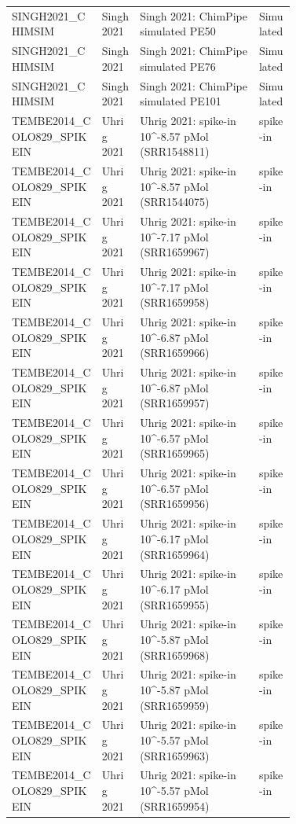 {\begin{longtable}{llp{0.42\linewidth}l}
SINGH2021\_CHIMSIM & Singh 2021 & Singh 2021: ChimPipe simulated PE50 & Simulated \\
SINGH2021\_CHIMSIM & Singh 2021 & Singh 2021: ChimPipe simulated PE76 & Simulated \\
SINGH2021\_CHIMSIM & Singh 2021 & Singh 2021: ChimPipe simulated PE101 & Simulated \\
TEMBE2014\_COLO829\_SPIKEIN & Uhrig 2021 & Uhrig 2021: spike-in 10\textasciicircum{}-8.57 pMol (SRR1548811) & spike-in \\
TEMBE2014\_COLO829\_SPIKEIN & Uhrig 2021 & Uhrig 2021: spike-in 10\textasciicircum{}-8.57 pMol (SRR1544075) & spike-in \\
TEMBE2014\_COLO829\_SPIKEIN & Uhrig 2021 & Uhrig 2021: spike-in 10\textasciicircum{}-7.17 pMol (SRR1659967) & spike-in \\
TEMBE2014\_COLO829\_SPIKEIN & Uhrig 2021 & Uhrig 2021: spike-in 10\textasciicircum{}-7.17 pMol (SRR1659958) & spike-in \\
TEMBE2014\_COLO829\_SPIKEIN & Uhrig 2021 & Uhrig 2021: spike-in 10\textasciicircum{}-6.87 pMol (SRR1659966) & spike-in \\
TEMBE2014\_COLO829\_SPIKEIN & Uhrig 2021 & Uhrig 2021: spike-in 10\textasciicircum{}-6.87 pMol (SRR1659957) & spike-in \\
TEMBE2014\_COLO829\_SPIKEIN & Uhrig 2021 & Uhrig 2021: spike-in 10\textasciicircum{}-6.57 pMol (SRR1659965) & spike-in \\
TEMBE2014\_COLO829\_SPIKEIN & Uhrig 2021 & Uhrig 2021: spike-in 10\textasciicircum{}-6.57 pMol (SRR1659956) & spike-in \\
TEMBE2014\_COLO829\_SPIKEIN & Uhrig 2021 & Uhrig 2021: spike-in 10\textasciicircum{}-6.17 pMol (SRR1659964) & spike-in \\
TEMBE2014\_COLO829\_SPIKEIN & Uhrig 2021 & Uhrig 2021: spike-in 10\textasciicircum{}-6.17 pMol (SRR1659955) & spike-in \\
TEMBE2014\_COLO829\_SPIKEIN & Uhrig 2021 & Uhrig 2021: spike-in 10\textasciicircum{}-5.87 pMol (SRR1659968) & spike-in \\
TEMBE2014\_COLO829\_SPIKEIN & Uhrig 2021 & Uhrig 2021: spike-in 10\textasciicircum{}-5.87 pMol (SRR1659959) & spike-in \\
TEMBE2014\_COLO829\_SPIKEIN & Uhrig 2021 & Uhrig 2021: spike-in 10\textasciicircum{}-5.57 pMol (SRR1659963) & spike-in \\
TEMBE2014\_COLO829\_SPIKEIN & Uhrig 2021 & Uhrig 2021: spike-in 10\textasciicircum{}-5.57 pMol (SRR1659954) & spike-in \\

\end{longtable}}
